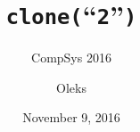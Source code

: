 \documentclass[xcolor=table]{beamer}
\title{\texttt{clone(}``\texttt{2}''\texttt{)}}
\subtitle{CompSys 2016}
\institute{DIKU}
\author{Oleks}
\date{November 9, 2016}
\begin{document}
\begin{frame} \titlepage \end{frame}
















\end{document}
